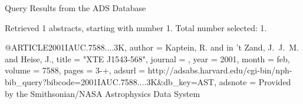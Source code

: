 Query Results from the ADS Database


Retrieved 1 abstracts, starting with number 1.  Total number selected: 1.

@ARTICLE{2001IAUC.7588....3K,
   author = {{Kaptein}, R. and {in 't Zand}, J.~J.~M. and {Heise}, J.},
    title = "{XTE J1543-568}",
  journal = {\iaucirc},
     year = 2001,
    month = feb,
   volume = 7588,
    pages = {3-+},
   adsurl = {http://adsabs.harvard.edu/cgi-bin/nph-bib_query?bibcode=2001IAUC.7588....3K&db_key=AST},
  adsnote = {Provided by the Smithsonian/NASA Astrophysics Data System}
}


